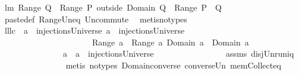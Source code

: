 \begin{isabellebody}
\endisatagproof
{\isafoldproof}%
%
\isadelimproof
\isanewline
%
\endisadelimproof
\isanewline
{}\isamarkupfalse%
\ lm{}{}{\isacharcolon}\ {\isachardoublequoteopen}Range\ Q\ {\isasymunion}\ {\isacharparenleft}Range\ {\isacharparenleft}P\ outside\ {\isacharparenleft}Domain\ Q{\isacharparenright}{\isacharparenright}{\isacharparenright}\ {\isacharequal}\ Range\ {\isacharparenleft}P\ {\isacharplus}{\isacharasterisk}\ Q{\isacharparenright}{\isachardoublequoteclose}\isanewline
%
\isadelimproof
\ \ \ \ \ \ \ \ \ \ \ \ %
\endisadelimproof
%
\isatagproof
{}\isamarkupfalse%
\ paste{\isacharunderscore}def\ Range{\isacharunderscore}Un{\isacharunderscore}eq\ Un{\isacharunderscore}commute\ \isamarkupfalse%
\ {\isacharparenleft}metis{\isacharparenleft}no{\isacharunderscore}types{\isacharparenright}{\isacharparenright}%
\endisatagproof
{\isafoldproof}%
%
\isadelimproof
\isanewline
%
\endisadelimproof
\isanewline
{}\isamarkupfalse%
\ lll{}{}c{\isacharcolon}\ \ {\isachardoublequoteopen}a{}\ {\isasymin}\ injectionsUniverse{\isachardoublequoteclose}\ {\isachardoublequoteopen}a{}\ {\isasymin}\ injectionsUniverse{\isachardoublequoteclose}\ \isanewline
\ \ \ \ \ \ \ \ \ \ \ \ \ \ \ \ \ \ \ \ \ \ {\isachardoublequoteopen}{\isacharparenleft}Range\ a{}{\isacharparenright}\ {\isasyminter}\ {\isacharparenleft}Range\ a{}{\isacharparenright}{\isacharequal}{\isacharbraceleft}{\isacharbraceright}{\isachardoublequoteclose}\ {\isachardoublequoteopen}{\isacharparenleft}Domain\ a{}{\isacharparenright}\ {\isasyminter}\ {\isacharparenleft}Domain\ a{}{\isacharparenright}\ {\isacharequal}\ {\isacharbraceleft}{\isacharbraceright}{\isachardoublequoteclose}\ \isanewline
\ \ \ \ \ \ \ \ \ \ \ \ \ \ \ {\isachardoublequoteopen}a{}\ {\isasymunion}\ a{}\ {\isasymin}\ injectionsUniverse{\isachardoublequoteclose}\ \isanewline
%
\isadelimproof
\ \ \ \ \ \ \ \ \ \ \ \ \ \ %
\endisadelimproof
%
\isatagproof
{}\isamarkupfalse%
\ assms\ disj{\isacharunderscore}Un{\isacharunderscore}runiq\ \isanewline
\ \ \ \ \ \ \ \ \ \ \ \ \ \ \isamarkupfalse%
\ {\isacharparenleft}metis\ {\isacharparenleft}no{\isacharunderscore}types{\isacharparenright}\ Domain{\isacharunderscore}converse\ converse{\isacharunderscore}Un\ mem{\isacharunderscore}Collect{\isacharunderscore}eq{\isacharparenright}%
\endisatagproof
{\isafoldproof}%
%
\isadelimproof
\isanewline

\end{isabellebody}
